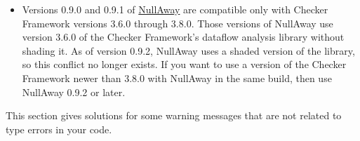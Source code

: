 \begin{itemize}
If you wish to use both Error Prone and the Checker Framework, then use
Error Prone version 2.4.0 or later.
If you cannot upgrade to Error Prone 2.4.0 or later, there is a way to
still use both tools.  The
 shows how to do so if you use the Gradle build
system.

\item
Versions 0.9.0 and 0.9.1 of
\href{https://github.com/uber/NullAway}{NullAway} are compatible
only with Checker Framework versions 3.6.0 through 3.8.0.  Those versions of
NullAway use version 3.6.0 of the Checker Framework's dataflow analysis
library without shading it.  As of version 0.9.2, NullAway uses a shaded version of
the library, so this conflict no longer exists.
If you want to use a version of the Checker Framework newer than 3.8.0 with
NullAway in the same build, then use NullAway 0.9.2 or later.

\end{itemize}



This section gives solutions for some warning messages that are not related
to type errors in your code.

